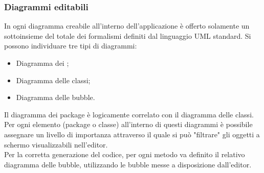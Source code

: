 \documentclass[../PianoDiQualifica.tex]{subfiles}
\begin{document}
			\subsubsection{Diagrammi editabili}
				In ogni diagramma creabile all'interno dell'applicazione è offerto solamente un
				sottoinsieme del totale dei formalismi definiti dal linguaggio UML standard.
				Si possono individuare tre tipi di diagrammi:
				\begin{itemize}
					\item Diagramma dei ;
					\item Diagramma delle classi;
					\item Diagramma delle bubble.
				\end{itemize}
				Il diagramma dei package è logicamente correlato con il diagramma delle classi. Per ogni
				elemento (package o classe) all'interno di questi diagrammi è possibile assegnare un
				livello di importanza attraverso il quale si può "filtrare" gli oggetti a schermo
				visualizzabili nell'editor.\\
				Per la corretta generazione del codice, per ogni metodo va definito il relativo diagramma delle bubble, utilizzando le bubble messe a disposizione dall'editor.
\end{document}

